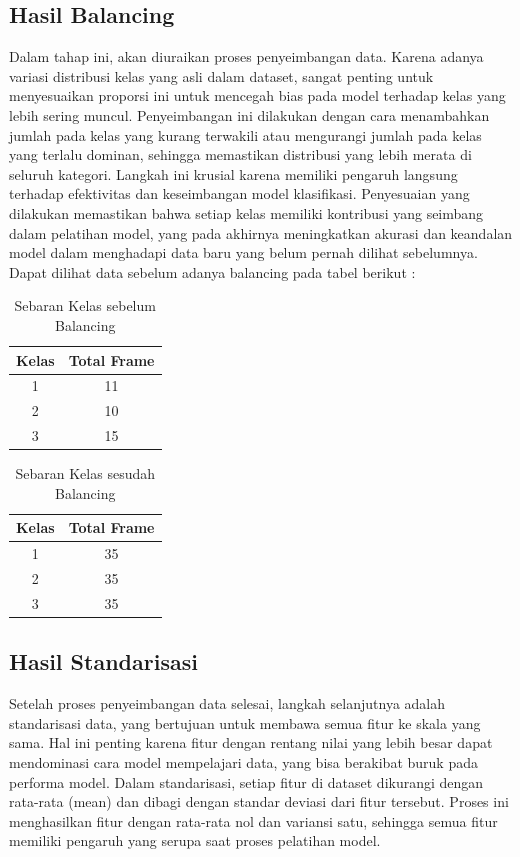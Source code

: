 \subsection{Hasil Balancing}
Dalam tahap ini, akan diuraikan proses penyeimbangan data. Karena adanya variasi distribusi kelas yang asli dalam dataset, sangat penting untuk menyesuaikan proporsi ini untuk mencegah bias pada model terhadap kelas yang lebih sering muncul. Penyeimbangan ini dilakukan dengan cara menambahkan jumlah pada kelas yang kurang terwakili atau mengurangi jumlah pada kelas yang terlalu dominan, sehingga memastikan distribusi yang lebih merata di seluruh kategori. Langkah ini krusial karena memiliki pengaruh langsung terhadap efektivitas dan keseimbangan model klasifikasi. Penyesuaian yang dilakukan memastikan bahwa setiap kelas memiliki kontribusi yang seimbang dalam pelatihan model, yang pada akhirnya meningkatkan akurasi dan keandalan model dalam menghadapi data baru yang belum pernah dilihat sebelumnya. Dapat dilihat data sebelum adanya balancing pada tabel berikut :


\begin{longtable}{|c|c|}
  \caption{Sebaran Kelas sebelum Balancing}
  \label{tb:SebaranKelasbf}                                   \\
  \hline
  \rowcolor[HTML]{C0C0C0}
 \textbf{Kelas} & \textbf{Total Frame} \\
  \hline
 1 & 11 \\
  2 & 10 \\
 3 & 15 \\
  \hline
\end{longtable}

\begin{longtable}{|c|c|}
  \caption{Sebaran Kelas sesudah Balancing}
  \label{tb:EnergiKecepatan}                                   \\
  \hline
  \rowcolor[HTML]{C0C0C0}
 \textbf{Kelas} & \textbf{Total Frame} \\
  \hline
 1 & 35 \\
  2 & 35 \\
 3 & 35 \\
  \hline
\end{longtable}


\subsection{Hasil Standarisasi}
Setelah proses penyeimbangan data selesai, langkah selanjutnya adalah standarisasi data, yang bertujuan untuk membawa semua fitur ke skala yang sama. Hal ini penting karena fitur dengan rentang nilai yang lebih besar dapat mendominasi cara model mempelajari data, yang bisa berakibat buruk pada performa model. Dalam standarisasi, setiap fitur di dataset dikurangi dengan rata-rata (mean) dan dibagi dengan standar deviasi dari fitur tersebut. Proses ini menghasilkan fitur dengan rata-rata nol dan variansi satu, sehingga semua fitur memiliki pengaruh yang serupa saat proses pelatihan model.

